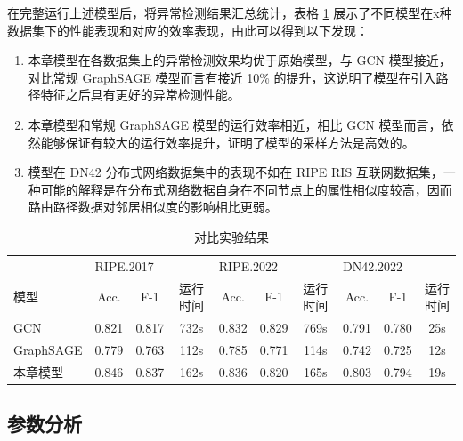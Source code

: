在完整运行上述模型后，将异常检测结果汇总统计，表格 \ref{c4_s3tab1} 展示了不同模型在x种数据集下的性能表现和对应的效率表现，由此可以得到以下发现：

\begin{enumerate}
    \item 本章模型在各数据集上的异常检测效果均优于原始模型，与 GCN 模型接近，对比常规 GraphSAGE 模型而言有接近 10\% 的提升，这说明了模型在引入路径特征之后具有更好的异常检测性能。
    \item 本章模型和常规 GraphSAGE 模型的运行效率相近，相比 GCN 模型而言，依然能够保证有较大的运行效率提升，证明了模型的采样方法是高效的。
    \item 模型在 DN42 分布式网络数据集中的表现不如在 RIPE RIS 互联网数据集，一种可能的解释是在分布式网络数据自身在不同节点上的属性相似度较高，因而路由路径数据对邻居相似度的影响相比更弱。
\end{enumerate}

\begin{table}
    \caption{对比实验结果}
    \begin{tabular}{lccccccccc}
        \toprule
                  & \multicolumn{3}{l}{RIPE.2017} & \multicolumn{3}{l}{RIPE.2022} & \multicolumn{3}{l}{DN42.2022}                                               \\ \cmidrule(lr){2-4} \cmidrule(lr){5-7} \cmidrule(lr){8-10}
        模型        & Acc.                          & F-1                           & 运行时间                          & Acc.  & F-1   & 运行时间 & Acc.  & F-1   & 运行时间 \\ \midrule
        GCN       & 0.821                         & 0.817                         & 732s                          & 0.832 & 0.829 & 769s & 0.791 & 0.780 & 25s  \\
        GraphSAGE & 0.779                         & 0.763                         & 112s                          & 0.785 & 0.771 & 114s & 0.742 & 0.725 & 12s  \\
        本章模型      & 0.846                         & 0.837                         & 162s                          & 0.836 & 0.820 & 165s & 0.803 & 0.794 & 19s  \\
        \bottomrule
    \end{tabular}
    \label{c4_s3tab1}
\end{table}

\subsection{参数分析}

